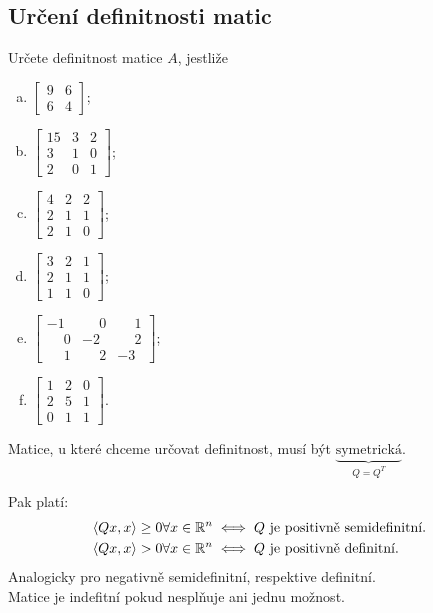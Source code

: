 \subsection{Určení definitnosti matic}
Určete definitnost matice $A$, jestliže
\begin{enumerate}[(a)]
    \item
    $\begin{bmatrix}
        9 & 6 \\
        6 & 4
    \end{bmatrix}$;
    \item
    $\begin{bmatrix}
        15 & 3 & 2 \\
        3 & 1 & 0 \\
        2 & 0 & 1
    \end{bmatrix}$;
    \item
    $\begin{bmatrix}
        4 & 2 & 2 \\
        2 & 1 & 1 \\
        2 & 1 & 0
    \end{bmatrix}$;
    \item
    $\begin{bmatrix}
        3 & 2 & 1 \\
        2 & 1 & 1 \\
        1 & 1 & 0
    \end{bmatrix}$;
    \item
    $\begin{bmatrix}
        -1 & \phantom{-}0 & \phantom{-}1 \\
        \phantom{-}0 & -2 & \phantom{-}2 \\
        \phantom{-}1 & \phantom{-}2 & -3
    \end{bmatrix}$;
    \item
    $\begin{bmatrix}
        1 & 2 & 0 \\
        2 & 5 & 1 \\
        0 & 1 & 1
    \end{bmatrix}$.
\end{enumerate}

Matice, u které chceme určovat definitnost, musí být $\underbrace{\text{symetrická}}_{Q = Q^T}$.

Pak platí:
\begin{align*}
    \langle Qx , x\rangle & \geq 0 \forall x \in \mathbb{R}^n \iff Q \text{ je positivně semidefinitní.}\\
    \langle Qx , x\rangle & > 0 \forall x \in \mathbb{R}^n \iff Q \text{ je positivně definitní.}
\end{align*} 
Analogicky pro negativně semidefinitní, respektive definitní. \\ Matice je indefitní pokud nesplňuje ani jednu možnost. 

